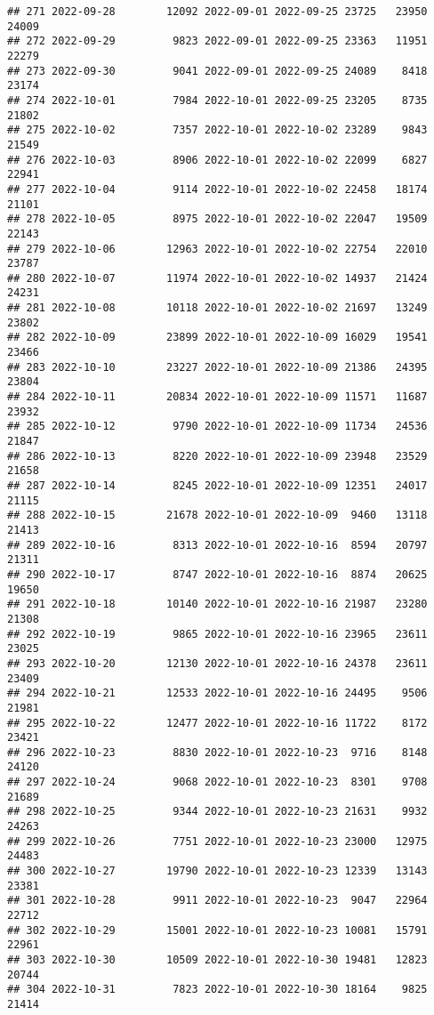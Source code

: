 \documentclass[
]{article}
\begin{document}
\begin{verbatim}
## 271 2022-09-28        12092 2022-09-01 2022-09-25 23725   23950      24009
## 272 2022-09-29         9823 2022-09-01 2022-09-25 23363   11951      22279
## 273 2022-09-30         9041 2022-09-01 2022-09-25 24089    8418      23174
## 274 2022-10-01         7984 2022-10-01 2022-09-25 23205    8735      21802
## 275 2022-10-02         7357 2022-10-01 2022-10-02 23289    9843      21549
## 276 2022-10-03         8906 2022-10-01 2022-10-02 22099    6827      22941
## 277 2022-10-04         9114 2022-10-01 2022-10-02 22458   18174      21101
## 278 2022-10-05         8975 2022-10-01 2022-10-02 22047   19509      22143
## 279 2022-10-06        12963 2022-10-01 2022-10-02 22754   22010      23787
## 280 2022-10-07        11974 2022-10-01 2022-10-02 14937   21424      24231
## 281 2022-10-08        10118 2022-10-01 2022-10-02 21697   13249      23802
## 282 2022-10-09        23899 2022-10-01 2022-10-09 16029   19541      23466
## 283 2022-10-10        23227 2022-10-01 2022-10-09 21386   24395      23804
## 284 2022-10-11        20834 2022-10-01 2022-10-09 11571   11687      23932
## 285 2022-10-12         9790 2022-10-01 2022-10-09 11734   24536      21847
## 286 2022-10-13         8220 2022-10-01 2022-10-09 23948   23529      21658
## 287 2022-10-14         8245 2022-10-01 2022-10-09 12351   24017      21115
## 288 2022-10-15        21678 2022-10-01 2022-10-09  9460   13118      21413
## 289 2022-10-16         8313 2022-10-01 2022-10-16  8594   20797      21311
## 290 2022-10-17         8747 2022-10-01 2022-10-16  8874   20625      19650
## 291 2022-10-18        10140 2022-10-01 2022-10-16 21987   23280      21308
## 292 2022-10-19         9865 2022-10-01 2022-10-16 23965   23611      23025
## 293 2022-10-20        12130 2022-10-01 2022-10-16 24378   23611      23409
## 294 2022-10-21        12533 2022-10-01 2022-10-16 24495    9506      21981
## 295 2022-10-22        12477 2022-10-01 2022-10-16 11722    8172      23421
## 296 2022-10-23         8830 2022-10-01 2022-10-23  9716    8148      24120
## 297 2022-10-24         9068 2022-10-01 2022-10-23  8301    9708      21689
## 298 2022-10-25         9344 2022-10-01 2022-10-23 21631    9932      24263
## 299 2022-10-26         7751 2022-10-01 2022-10-23 23000   12975      24483
## 300 2022-10-27        19790 2022-10-01 2022-10-23 12339   13143      23381
## 301 2022-10-28         9911 2022-10-01 2022-10-23  9047   22964      22712
## 302 2022-10-29        15001 2022-10-01 2022-10-23 10081   15791      22961
## 303 2022-10-30        10509 2022-10-01 2022-10-30 19481   12823      20744
## 304 2022-10-31         7823 2022-10-01 2022-10-30 18164    9825      21414

\end{verbatim}
\end{document}
